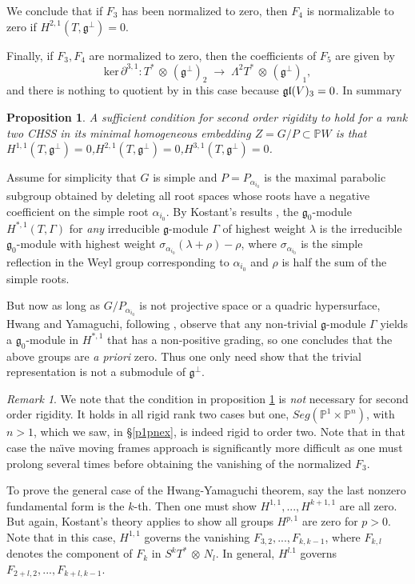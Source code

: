 \documentclass[11pt]{amsart}
\newtheorem{proposition}[theorem]{Proposition}
\theoremstyle{definition}
\theoremstyle{remark}
\newtheorem{remark}[theorem]{Remark}
\numberwithin{equation}{section}
\def\s{\sigma}
\def\BP{\mathbb P}
\def\pp#1{\mathbb P^{#1}}
\def\pp#1{{\mathbb P}^{#1}}
\def\hd{,...,}
\def\upperp{{}^\perp}
\def\fg{{\mathfrak g}}
\def\l{\lambda}
\def\a{\alpha}
\def\s{\sigma}
\def\ot{{\mathord{\,\otimes }\,}}
\def\ra{{\mathord{\;\rightarrow\;}}}
\def\La#1{\Lambda^{#1}}
\def\tker{\text{ker}\,}
\begin{document}
We conclude that  if $F_3$ has been normalized to zero, then $F_4$ is normalizable to
zero if $H^{2,1}(T,\fg\upperp)=0$.

Finally, if $F_3,F_4$ are normalized to zero, then the coefficients of $F_5$ are
given by 
$$\tker\partial^{3,1}: T^*\ot (\fg\upperp)_2\ra \La 2T^*\ot (\fg\upperp)_1,
$$
and   there is nothing to quotient by in this case
because $\mathfrak g\mathfrak l(V)_3=0$.
In summary
\begin{proposition}\label{suffprop}
A sufficient condition for second order rigidity to hold for a rank two CHSS
in its minimal homogeneous embedding $Z=G/P\subset \BP W$
is that $H^{1,1}(T,\fg\upperp)=0$,$H^{2,1}(T,\fg\upperp)=0$,$H^{3,1}(T,\fg\upperp)=0$.
\end{proposition}

Assume for simplicity that $G$ is simple and $P=P_{\a_{i_0}}$
is the maximal parabolic subgroup obtained
by deleting all root spaces whose roots have a negative coefficient on
the simple root $\a_{i_0}$.
By Kostant's results \cite{kostant}, the $\fg_0$-module
$H^{*,1}(T,\Gamma)$ for {\it any} irreducible $\fg$-module $\Gamma$ of
highest weight $\l$
is the irreducible $\fg_0$-module with highest weight
$\s_{\a_{i_0}}(\l +\rho)-\rho$, where    $\s_{\a_{i_0}}$ is the   simple
reflection in the Weyl group
corresponding to $\a_{i_0}$ and $\rho$ is half the sum of the simple roots.
 
But now as long as $G/P_{\a_{i_0}}$ is not projective space or
a quadric hypersurface, 
Hwang and Yamaguchi, following \cite{SYY},  observe that
any non-trivial $\fg$-module $\Gamma$ yields
a $\fg_0$-module in $H^{*,1}$ that has a non-positive grading, so
one concludes that the above groups are {\it a priori} zero.
Thus one only need show that the trivial representation
is not a submodule of $\fg\upperp$.
 

\begin{remark} We note that the condition  in
proposition \ref{suffprop}  is {\it not} necessary for second
order rigidity. It holds in all rigid rank two cases but one,
$Seg(\pp 1\times \pp n)$, with $n>1$, which we saw, in \S\ref{p1pnex}, is
indeed rigid to order two. Note that in that case the na\"\i ve moving frames approach is
significantly more difficult as one must prolong several times before obtaining the
vanishing of the normalized $F_3$.
\end{remark}

To prove the general case of the Hwang-Yamaguchi theorem, 
say the last nonzero fundamental form is the $k$-th. Then one must show
$H^{1,1}\hd H^{k+1,1}$ are all zero. 
But again, Kostant's theory applies to show
all groups $H^{p,1}$ are zero for $p>0$.  Note that in this case, $H^{1,1}$
governs the vanishing   $F_{3,2}\hd F_{k,k-1}$, where $F_{k,l}$ denotes the
component of $F_k$ in $S^kT^*\ot N_l$.
In general, $H^{l.1}$ governs $F_{2+l,2}\hd F_{k+l,k-1}$.
\end{document}
